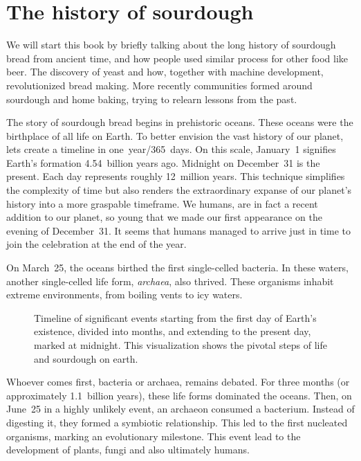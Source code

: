 \chapter{The history of sourdough}%
\label{ch:history}
\begin{quoting}
    We will start this book by briefly talking about the long history of
    sourdough bread from ancient time, and how people used similar process for
    other food like beer. The discovery of yeast and how, together with
    machine development, revolutionized bread making.  More recently
    communities formed around sourdough and home baking, trying to relearn
    lessons from the past.
\end{quoting}

The story of sourdough bread begins in prehistoric oceans. These oceans were the
birthplace of all life on Earth. To better envision the vast history of
our planet, lets create a timeline in one~year/365~days. On this scale,
January~1 signifies Earth's
formation 4.54~billion years ago. Midnight on December~31 is the present.
Each day represents roughly 12~million years. This technique simplifies the
complexity of time but also renders the extraordinary expanse of our planet's
history into a more graspable timeframe. We humans, are in fact a recent
addition to our planet, so young that we made our first appearance on
the evening of December~31.  It seems that humans managed to arrive just
in time to join the celebration at the end of the year.

On March~25, the oceans birthed the first single-celled bacteria. In these
waters, another single-celled life form, \emph{archaea}, also thrived. These
organisms inhabit extreme environments, from boiling vents to icy waters.

\begin{figure}[!htb]
\centering
  
  \caption[Sourdough microbiology timeline]{Timeline of significant events
    starting from the first day of Earth's existence,
    divided into months, and extending to the present day,
    marked at midnight. This visualization shows the pivotal steps
    of life and sourdough on earth.}%
  \label{fig:planet-timeline}
\end{figure}

Whoever comes first, bacteria or archaea, remains debated. For three
months (or approximately 1.1~billion years), these life forms dominated
the oceans. Then, on June~25 in a highly unlikely event, an archaeon consumed a bacterium.
Instead of digesting it, they formed a symbiotic relationship. This led to the
first nucleated organisms, marking an evolutionary milestone. This event lead
to the development of plants, fungi and also ultimately humans.


